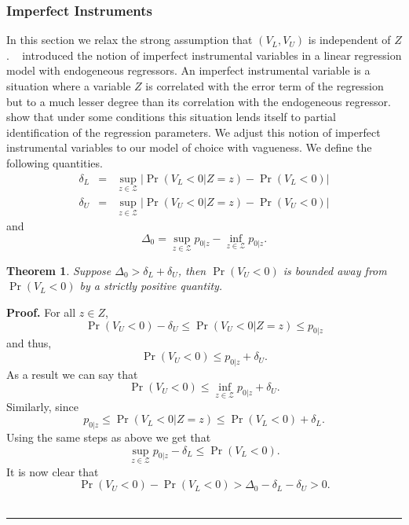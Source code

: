 \documentclass{article}
\newtheorem{theorem}{Theorem}
\newenvironment{proof}[1][Proof]{\textbf{#1.} }{\ \rule{0.5em}{0.5em}}
\renewcommand{\cite}{\citet}
\begin{document}
\subsubsection{Imperfect Instruments}

In this section we relax the strong assumption that $\left(
V_{L},V_{U}\right) $ is independent of $Z$. \ \cite{NevoRosen} introduced
the notion of imperfect instrumental variables in a linear regression model
with endogeneous regressors. An imperfect instrumental variable is a
situation where a variable $Z$ is correlated with the error term of the
regression but to a much lesser degree than its correlation with the
endogeneous regressor. \cite{NevoRosen} show that under some conditions this
situation lends itself to partial identification of the regression
parameters. We adjust this notion of imperfect instrumental variables to our
model of choice with vagueness. We define the following quantities.%
\begin{eqnarray*}
\delta _{L} &=&\sup_{z\in \mathcal{Z}}\left\vert \Pr \left(
V_{L}<0|Z=z\right) -\Pr \left( V_{L}<0\right) \right\vert \\
\delta _{U} &=&\sup_{z\in \mathcal{Z}}\left\vert \Pr \left(
V_{U}<0|Z=z\right) -\Pr \left( V_{U}<0\right) \right\vert
\end{eqnarray*}%
and%
\begin{equation*}
\Delta _{0}=\sup_{z\in \mathcal{Z}}p_{0|z}-\inf_{z\in \mathcal{Z}}p_{0|z}.
\end{equation*}

\begin{theorem}
Suppose $\Delta _{0}>\delta _{L}+\delta _{U}$, then $\Pr \left(
V_{U}<0\right) $ is bounded away from $\Pr \left( V_{L}<0\right) $ by a
strictly positive quantity.
\end{theorem}

\begin{proof}
For all $z\in Z$, 
\begin{equation*}
\Pr (V_{U}<0)-\delta _{U}\leq \Pr \left( V_{U}<0|Z=z\right) \leq p_{0|z}
\end{equation*}%
and thus,%
\begin{equation*}
\Pr (V_{U}<0)\leq p_{0|z}+\delta _{U}.
\end{equation*}%
As a result we can say that%
\begin{equation*}
\Pr \left( V_{U}<0\right) \leq \inf_{z\in \mathcal{Z}}p_{0|z}+\delta _{U}.
\end{equation*}%
Similarly, since 
\begin{equation*}
p_{0|z}\leq \Pr \left( V_{L}<0|Z=z\right) \leq \Pr (V_{L}<0)+\delta _{L}.
\end{equation*}%
Using the same steps as above we get that%
\begin{equation*}
\sup_{z\in \mathcal{Z}}p_{0|z}-\delta _{L}\leq \Pr \left( V_{L}<0\right) .
\end{equation*}%
It is now clear that 
\begin{equation*}
\Pr (V_{U}<0)-\Pr \left( V_{L}<0\right) >\Delta _{0}-\delta _{L}-\delta
_{U}>0.
\end{equation*}
\end{proof}
\end{document}
